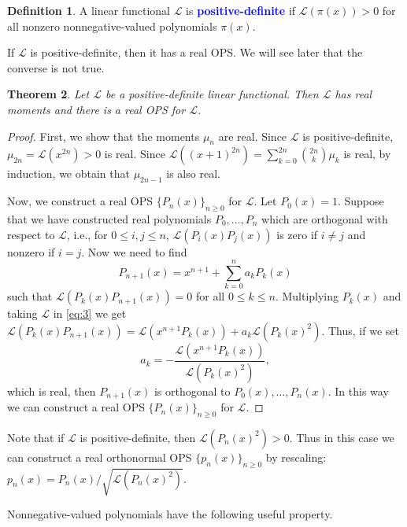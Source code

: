\documentclass[oneside]{book}
\numberwithin{equation}{section}
\newtheorem{thm}{Theorem}[section]
\theoremstyle{definition}
\newtheorem{defn}[thm]{Definition}
\newcommand\LL{\mathcal{L}}
\renewcommand\emph[1]{\textcolor{blue}{\bf #1}}
\begin{document}
\begin{defn}
  A linear functional \( \LL \) is \emph{positive-definite} if
  \( \LL(\pi(x))>0 \) for all nonzero nonnegative-valued polynomials
  \( \pi(x) \).
\end{defn}

If \( \LL \) is positive-definite, then it has a real OPS. We will see
later that the converse is not true.

\begin{thm}\label{thm:pos-def-ops}
  Let \( \LL \) be a positive-definite linear functional. Then
  \( \LL \) has real moments and there is a real OPS for \( \LL \).
\end{thm}

\begin{proof}
  First, we show that the moments \( \mu_n \) are real. Since
  \( \LL \) is positive-definite, \( \mu_{2n} = \LL(x^{2n}) >0 \) is
  real. Since
  \( \LL((x+1)^{2n}) = \sum_{k=0}^{2n}\binom{2n}{k} \mu_{k} \) is
  real, by induction, we obtain that \( \mu_{2n-1} \) is also real.

  Now, we construct a real OPS \( \{ P_n(x) \}_{n\ge 0} \) for
  \( \LL \). Let \( P_0(x) = 1 \). Suppose that we have constructed
  real polynomials \( P_0,\dots,P_n \) which are orthogonal with
  respect to \( \LL \), i.e., for \( 0\le i,j\le n \),
  \( \LL(P_i(x)P_j(x)) \) is zero if \( i\ne j \) and nonzero if
  \( i=j \). Now we need to find
  \begin{equation}\label{eq:3}
    P_{n+1} (x) = x^{n+1} + \sum_{k=0}^n a_k P_k(x)
  \end{equation}
  such that \( \LL(P_k(x)P_{n+1}(x)) = 0 \) for all \( 0\le k\le n \).
  Multiplying \( P_k(x) \) and taking \( \LL \) in \eqref{eq:3} we get
  \( \LL(P_k(x)P_{n+1}(x)) = \LL(x^{n+1}P_k(x))+a_k\LL(P_k(x)^2) \).
  Thus, if we set
  \[
    a_k = - \frac{\LL(x^{n+1}P_k(x))}{\LL(P_k(x)^2)},
  \]
  which is real, then \( P_{n+1}(x) \) is orthogonal to
  \( P_0(x),\dots,P_n(x) \). In this way we can construct a real OPS
  \( \{ P_n(x) \}_{n\ge 0} \) for \( \LL \).
\end{proof}

Note that if \( \LL \) is positive-definite, then
\( \LL(P_n(x)^2)>0 \). Thus in this case we can construct a real
orthonormal OPS \( \{ p_n(x) \}_{n\ge 0} \) by rescaling:
\( p_n(x) = P_n(x)/\sqrt{\LL(P_n(x)^2)} \).

Nonnegative-valued polynomials have the following useful property.
\end{document}
